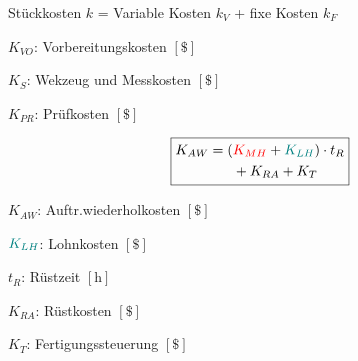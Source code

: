 \begin{tiny}
\begin{center}
    Stückkosten $k$ = Variable Kosten $k_V$ + fixe Kosten $k_F$   
\end{center}
\vspace{1mm}

\begin{minipage}{0.5\linewidth}
    \begin{footnotesize}
        \begin{center}
        \end{center}
    \end{footnotesize}
\end{minipage}
\begin{minipage}{0.5\linewidth}
        \item $K_{VO}$: Vorbereitungskosten $\left[\$\right]$
        \item $K_S$: Wekzeug und Messkosten $\left[\$\right]$
        \item $K_{PR}$: Prüfkosten $\left[\$\right]$
\end{minipage}
\vspace{1mm}

\hspace{0.05\linewidth}

\begin{minipage}{0.5\linewidth}
\[
\boxed{
    \begin{aligned}
        K_{AW} = (&\textcolor{red} {K_{MH}} + \textcolor{teal}{K_{LH}}) \cdot t_R\\
        &+ K_{RA} + K_T
    \end{aligned}
}
\]
\end{minipage}
\begin{minipage}{0.5\linewidth}
        \item $K_{AW}$: Auftr.wiederholkosten $\left[\$\right]$
        \item $\textcolor{teal}{K_{LH}}$: Lohnkosten $\left[\$\right]$
        \item $t_R$: Rüstzeit $\left[\text{h}\right]$
        \item $K_{RA}$: Rüstkosten $\left[\$\right]$
        \item $K_T$: Fertigungssteuerung $\left[\$\right]$
\end{minipage}
\vspace{1mm}

\hspace{0.05\linewidth}


\end{tiny}
